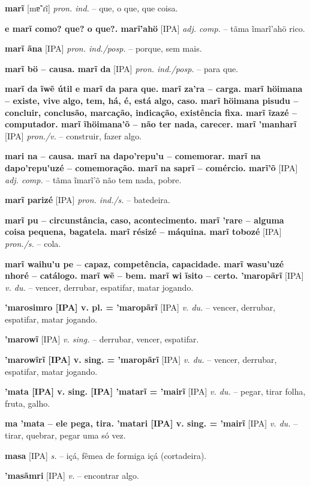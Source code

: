 \textbf{marĩ} [mɐ̃ˈɾĩ] \textit{pron. ind.} -- que, o que, que coisa.

\textbf{e marĩ como? que? o que?. marĩ'ahö} [IPA] \textit{adj. comp.} -- tãma ĩmarĩ'ahö rico.

\textbf{marĩ ãna} [IPA] \textit{pron. ind./posp.} -- porque, sem mais.

\textbf{marĩ bö -- causa. marĩ da} [IPA] \textit{pron. ind./posp.} -- para que.

\textbf{marĩ da ĩwẽ útil  e marĩ da para que. marĩ za'ra -- carga. marĩ höimana -- existe, vive algo, tem, há, é, está algo, caso. marĩ höimana pisudu -- concluir, conclusão, marcação, indicação, existência fixa. marĩ ĩzazé -- computador. marĩ ĩhöimana'õ -- não ter nada, carecer. marĩ 'manharĩ} [IPA] \textit{pron./v.} -- construir, fazer algo.

\textbf{mari na -- causa. marĩ na dapo'repu'u -- comemorar. marĩ na dapo'repu'uzé -- comemoração. marĩ na saprĩ -- comércio. marĩ'õ} [IPA] \textit{adj. comp.} -- tãma ĩmarĩ'õ não tem nada, pobre.

\textbf{marĩ parizé} [IPA] \textit{pron. ind./s.} -- batedeira.

\textbf{marĩ pu -- circunstância, caso, acontecimento. marĩ 'rare -- alguma coisa pequena, bagatela. marĩ résizé -- máquina. marĩ tobozé} [IPA] \textit{pron./s.} -- cola.

\textbf{marĩ waihu'u pe -- capaz, competência, capacidade. marĩ wasu'uzé nhoré -- catálogo. marĩ wẽ -- bem. marĩ wi ĩsito -- certo. 'maropãrĩ} [IPA] \textit{v. du.} -- vencer, derrubar, espatifar, matar jogando.

\textbf{'marosimro [IPA] v. pl. = 'maropãrĩ} [IPA] \textit{v. du.} -- vencer, derrubar, espatifar, matar jogando.

\textbf{'marowĩ} [IPA] \textit{v. sing.} -- derrubar, vencer, espatifar.

\textbf{'marowĩrĩ [IPA] v. sing. = 'maropãrĩ} [IPA] \textit{v. du.} -- vencer, derrubar, espatifar, matar jogando.

\textbf{'mata [IPA] v. sing. [IPA] 'matarĩ = 'mairĩ} [IPA] \textit{v. du.} -- pegar, tirar folha, fruta, galho.

\textbf{ma 'mata -- ele pega, tira. 'matari [IPA] v. sing. = 'mairĩ} [IPA] \textit{v. du.} -- tirar, quebrar, pegar uma só vez.

\textbf{masa} [IPA] \textit{s.} -- içá, fêmea de formiga içá (cortadeira).

\textbf{'masãmri} [IPA] \textit{v.} -- encontrar algo.

